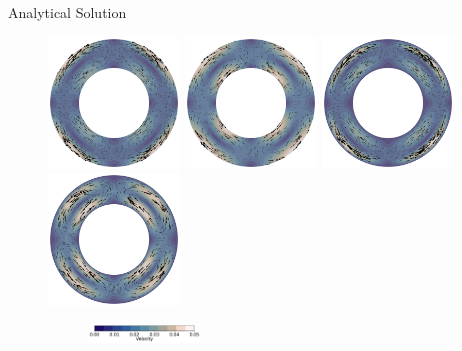 \documentclass[10pt,aspectratio=169]{beamer}
\begin{document}
\begin{frame}{Analytical Solution}
	\vspace{-0.32in}
	\begin{figure}[!htb]
		\begin{multicols}{4}
			\includegraphics[width=3.5cm]{./case1/vel_ana.png}\par
			\hspace{0.75in}
			\includegraphics[width=3.5cm]{./case2/vel_ana.png}\par
			\hspace{1.5in}
			\includegraphics[width=3.5cm]{./case3/vel_ana.png}\par
			\hspace{2.25in}
			\includegraphics[width=3.5cm]{./case4/vel_ana.png}
		\end{multicols}
		\vspace{-0.29in}
		\begin{figure}
			\hspace{0.1in} 
			\includegraphics[width=3cm]{./case1/v_ana_cbhorz.pdf}
		\end{figure}
	\end{figure}
	

\end{frame}
\end{document}
